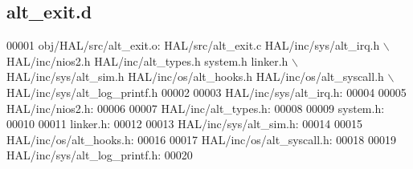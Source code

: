 \subsection{alt\+\_\+exit.\+d}
\label{alt__exit_8d_source}

\begin{DoxyCode}
00001 obj/HAL/src/alt\_exit.o: HAL/src/alt\_exit.c HAL/inc/sys/alt_irq.h \(\backslash\)
 HAL/inc/nios2.h HAL/inc/alt\_types.h system.h linker.h \(\backslash\)
 HAL/inc/sys/alt\_sim.h HAL/inc/os/alt\_hooks.h HAL/inc/os/alt\_syscall.h \(\backslash\)
 HAL/inc/sys/alt\_log\_printf.h
00002 
00003 HAL/inc/sys/alt_irq.h:
00004 
00005 HAL/inc/nios2.h:
00006 
00007 HAL/inc/alt\_types.h:
00008 
00009 system.h:
00010 
00011 linker.h:
00012 
00013 HAL/inc/sys/alt\_sim.h:
00014 
00015 HAL/inc/os/alt\_hooks.h:
00016 
00017 HAL/inc/os/alt\_syscall.h:
00018 
00019 HAL/inc/sys/alt\_log\_printf.h:
00020 \end{DoxyCode}

